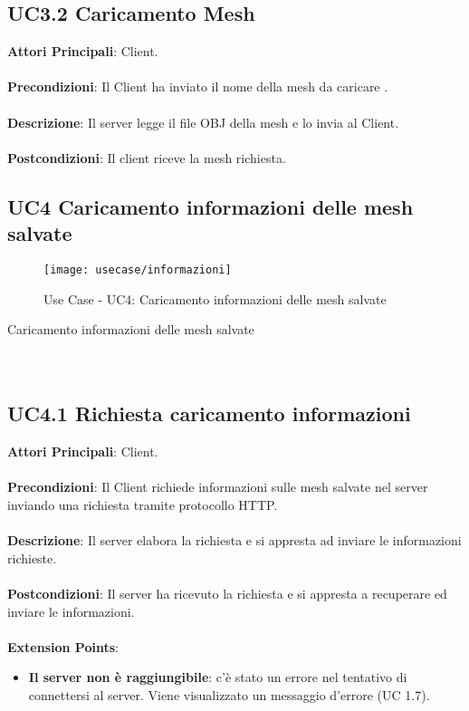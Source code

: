 \subsection{UC3.2 Caricamento Mesh}
\textbf{Attori Principali}: Client.
\\\\ \textbf{Precondizioni}: Il Client ha inviato il nome della mesh da caricare .
\\\\ \textbf{Descrizione}: Il server legge il file OBJ della mesh e lo invia al Client.
\\\\ \textbf{Postcondizioni}: Il client riceve la mesh richiesta.

\newpage
\subsection{UC4 Caricamento informazioni delle mesh salvate}
\begin{figure}[!h] 
    \centering 
    \texttt{[image: usecase/informazioni]} 
    \caption{Use Case - UC4: Caricamento informazioni delle mesh salvate}
\end{figure}

\begin{usecase}{4}{Caricamento informazioni delle mesh salvate}
\\ 
\\ 
\\ 
\label{uc:informazioni}
\end{usecase}

\subsection{UC4.1 Richiesta caricamento informazioni}
\textbf{Attori Principali}: Client.
\\\\ \textbf{Precondizioni}: Il Client richiede informazioni sulle mesh salvate nel server inviando una richiesta tramite protocollo HTTP.
\\\\ \textbf{Descrizione}: Il server elabora la richiesta e si appresta ad inviare le informazioni richieste.
\\\\ \textbf{Postcondizioni}: Il server ha ricevuto la richiesta e si appresta a recuperare ed inviare le informazioni.
\\\\ \textbf{Extension Points}:
\begin{itemize}
\item \textbf{Il server non è raggiungibile}: c'è stato un errore nel tentativo di connettersi al server. Viene visualizzato un messaggio d'errore (UC 1.7).
\end{itemize}

